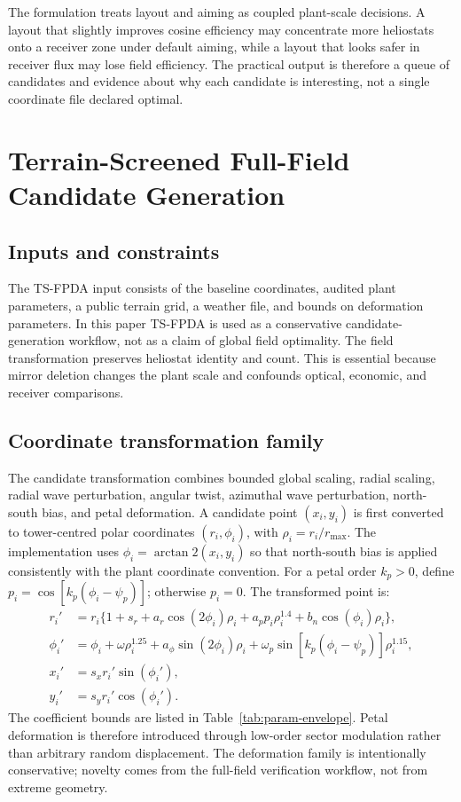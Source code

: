\documentclass[final,3p,times]{elsarticle}
\begin{document}
The formulation treats layout and aiming as coupled plant-scale decisions. A layout that slightly improves cosine efficiency may concentrate more heliostats onto a receiver zone under default aiming, while a layout that looks safer in receiver flux may lose field efficiency. The practical output is therefore a queue of candidates and evidence about why each candidate is interesting, not a single coordinate file declared optimal.

\section{Terrain-Screened Full-Field Candidate Generation}
\subsection{Inputs and constraints}
The TS-FPDA input consists of the baseline coordinates, audited plant parameters, a public terrain grid, a weather file, and bounds on deformation parameters. In this paper TS-FPDA is used as a conservative candidate-generation workflow, not as a claim of global field optimality. The field transformation preserves heliostat identity and count. This is essential because mirror deletion changes the plant scale and confounds optical, economic, and receiver comparisons.

\subsection{Coordinate transformation family}
The candidate transformation combines bounded global scaling, radial scaling, radial wave perturbation, angular twist, azimuthal wave perturbation, north-south bias, and petal deformation. A candidate point $(x_i,y_i)$ is first converted to tower-centred polar coordinates $(r_i,\phi_i)$, with $\rho_i=r_i/r_{\max}$. The implementation uses $\phi_i=\arctan2(x_i,y_i)$ so that north-south bias is applied consistently with the plant coordinate convention. For a petal order $k_p>0$, define $p_i=\cos[k_p(\phi_i-\psi_p)]$; otherwise $p_i=0$. The transformed point is:
\begin{align}
r_i' &= r_i\{1+s_r+a_r\cos(2\phi_i)\rho_i+a_p p_i\rho_i^{1.4}+b_n\cos(\phi_i)\rho_i\},\\
\phi_i' &= \phi_i+\omega \rho_i^{1.25}+a_\phi\sin(2\phi_i)\rho_i+\omega_p\sin[k_p(\phi_i-\psi_p)]\rho_i^{1.15},\\
x_i' &= s_x r_i' \sin(\phi_i'),\\
y_i' &= s_y r_i' \cos(\phi_i').
\end{align}
The coefficient bounds are listed in Table~\ref{tab:param-envelope}. Petal deformation is therefore introduced through low-order sector modulation rather than arbitrary random displacement. The deformation family is intentionally conservative; novelty comes from the full-field verification workflow, not from extreme geometry.
\end{document}

